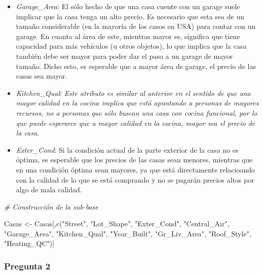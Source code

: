 \documentclass[
]{article}
\newenvironment{Shaded}{\begin{snugshade}}{\end{snugshade}}
\newcommand{\CommentTok}[1]{\textcolor[rgb]{0.56,0.35,0.01}{\textit{#1}}}
\newcommand{\FunctionTok}[1]{\textcolor[rgb]{0.00,0.00,0.00}{#1}}
\newcommand{\NormalTok}[1]{#1}
\newcommand{\OtherTok}[1]{\textcolor[rgb]{0.56,0.35,0.01}{#1}}
\newcommand{\StringTok}[1]{\textcolor[rgb]{0.31,0.60,0.02}{#1}}
\begin{document}
\begin{itemize}
\item
  \emph{Garage\_Area}: El sólo hecho de que una casa cuente con un
  garage suele implicar que la casa tenga un alto precio. Es necesario
  que esta sea de un tamaño considerable (en la mayoría de los casos en
  USA) para contar con un garage. En cuanto al área de este, mientras
  mayor es, significa que tiene capacidad para más vehículos (u otros
  objetos), lo que implica que la casa también debe ser mayor para poder
  dar el paso a un garage de mayor tamaño. Dicho esto, es esperable que
  a mayor área de garage, el precio de las casas sea mayor.
\item
  \emph{Kitchen\_Qual}: \emph{Este atributo es similar al anterior en el
  sentido de que una mayor calidad en la cocina implica que está
  apuntando a personas de mayores recursos, no a personas que sólo
  buscan una casa con cocina funcional, por lo que puede esperarce que a
  mayor calidad en la cocina, mayor sea el precio de la casa.}
\item
  \emph{Exter\_Cond}: Si la condición actual de la parte exterior de la
  casa no es óptima, es esperable que los precios de las casas sean
  menores, mientras que en una condición óptima sean mayores, ya que
  está directamente relacioando con la calidad de lo que se está
  comprando y no se pagarán precios altos por algo de mala calidad.
\end{itemize}

\begin{Shaded}
\begin{Highlighting}[]
\CommentTok{\# Construcción de la sub{-}base}

\NormalTok{Casas }\OtherTok{\textless{}{-}}\NormalTok{ Casas[,}\FunctionTok{c}\NormalTok{(}\StringTok{"Street"}\NormalTok{, }\StringTok{"Lot\_Shape"}\NormalTok{, }\StringTok{"Exter\_Cond"}\NormalTok{, }\StringTok{"Central\_Air"}\NormalTok{, }\StringTok{"Garage\_Area"}\NormalTok{, }\StringTok{"Kitchen\_Qual"}\NormalTok{, }\StringTok{"Year\_Built"}\NormalTok{, }\StringTok{"Gr\_Liv\_Area"}\NormalTok{, }\StringTok{"Roof\_Style"}\NormalTok{, }\StringTok{"Heating\_QC"}\NormalTok{)]}
\end{Highlighting}
\end{Shaded}

\hypertarget{pregunta-2}{%
\subsubsection{Pregunta 2}\label{pregunta-2}}
\end{document}
